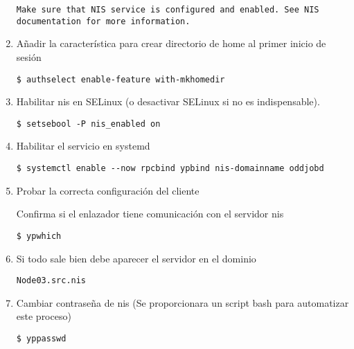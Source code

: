 \documentclass[../main.tex]{subfiles}
\begin{document}
\begin{enumerate}
\begin{listing}[H]
\begin{verbatim}
Make sure that NIS service is configured and enabled. See NIS documentation for more information.
\end{verbatim}
        \end{listing}

  \item Añadir la característica para crear directorio de home al
        primer inicio de sesión
        \begin{listing}[H]
\begin{verbatim}
$ authselect enable-feature with-mkhomedir
\end{verbatim}
        \end{listing}

  \item Habilitar \acrshort{nis} en SELinux (o desactivar SELinux si no es indispensable).
        \begin{listing}[H]
\begin{verbatim}
$ setsebool -P nis_enabled on
\end{verbatim}
        \end{listing}

  \item Habilitar el servicio en \Gls{systemd}
        \begin{listing}[H]
\begin{verbatim}
$ systemctl enable --now rpcbind ypbind nis-domainname oddjobd
\end{verbatim}
        \end{listing}

  \item Probar la correcta configuración del cliente

        Confirma si el enlazador tiene comunicación con el servidor \acrshort{nis}
        \begin{listing}[H]
\begin{verbatim}
$ ypwhich
\end{verbatim}
        \end{listing}
  \item Si todo sale bien debe aparecer el servidor en el dominio
        \begin{listing}[H]
\begin{verbatim}
Node03.src.nis
\end{verbatim}
        \end{listing}
  \item Cambiar contraseña de \acrshort{nis} (Se proporcionara un
        script bash para automatizar este proceso)
        \begin{listing}[H]
\begin{verbatim}
$ yppasswd
\end{verbatim}
        \end{listing}

\end{enumerate}
\end{document}

